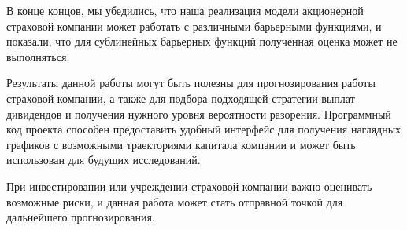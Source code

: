 \documentclass{article}
\theoremstyle{plain}
\theoremstyle{plain}
\theoremstyle{plain}
\theoremstyle{plain}
\theoremstyle{definition}
\theoremstyle{remark}
\begin{document}
В конце концов, мы убедились, что наша реализация модели акционерной страховой компании может работать с различными барьерными функциями, и показали, что для сублинейных барьерных функций полученная оценка может не выполняться.

Результаты данной работы могут быть полезны для прогнозирования работы страховой компании, а также для подбора подходящей стратегии выплат дивидендов и получения нужного уровня вероятности разорения. Программный код проекта способен предоставить удобный интерфейс для получения наглядных графиков с возможными траекториями капитала компании и может быть использован для будущих исследований.

При инвестировании или учреждении страховой компании важно оценивать возможные риски, и данная работа может стать отправной точкой для дальнейшего прогнозирования.

\clearpage



\end{document}

